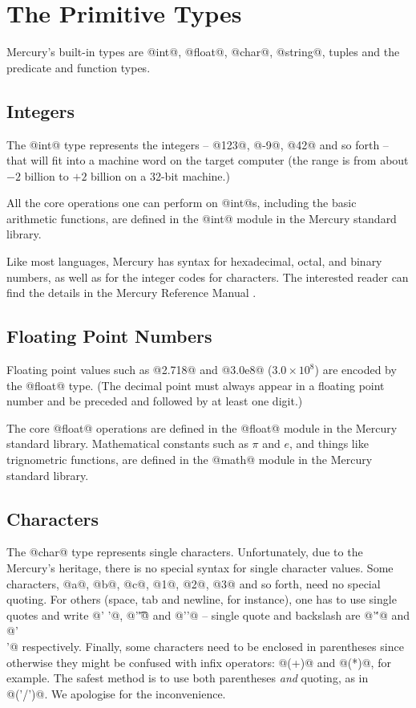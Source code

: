 \section{The Primitive Types}

Mercury's built-in types are @int@, @float@, @char@, @string@, tuples and
the predicate and function types.

\subsection{Integers}

The @int@ type represents the integers -- @123@, @-9@, @42@ and so forth -- that
will fit into a machine word on the target computer (the range is from
about $-2$ billion to $+2$ billion on a 32-bit machine.)

All the core operations one can perform on @int@s, including the basic
arithmetic functions, are defined in the @int@ module in the Mercury
standard library.

Like most languages, Mercury has syntax for hexadecimal, octal, and binary
numbers, as well as for the integer codes for characters.  The interested
reader can find the details in the Mercury Reference Manual \XXX{}.

\subsection{Floating Point Numbers}

Floating point values such as @2.718@ and @3.0e8@ ($3.0\times10^8$) are
encoded by the @float@ type.  (The decimal point must always
appear in a floating point number and be preceded and followed by at
least one digit.)

The core @float@ operations are defined in the @float@ module in the
Mercury standard library.  Mathematical constants such as $\pi$ and $e$, and
things like trignometric functions, are defined in the @math@ module in the
Mercury standard library.

\subsection{Characters}

The @char@ type represents single characters.  Unfortunately, due to the
Mercury's heritage, there is no special syntax for single character
values.  Some characters, @a@, @b@, @c@, @1@, @2@, @3@ and so forth,
need no special quoting.
For others (space, tab and newline, for instance), one has to use
single quotes and write @' '@, @'\t'@ and
@'\n'@ -- single quote and backslash are @'\''@ and
@'\\'@ respectively.
Finally, some characters need to be enclosed in parentheses since
otherwise they might be confused with infix operators: @(+)@ and
@(*)@, for example.
The safest method is to use both parentheses \emph{and} quoting, as in
@('/')@.  We apologise for the inconvenience.

